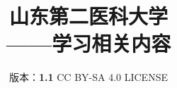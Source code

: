 

\title{%
    \normalsize
    \vspace{120pt}
    {\Huge\textbf{山东第二医科大学\\[5pt]——学习相关内容}}
}
\author{%
    版本：\textbf{1.1} \qquad%
    CC BY-SA 4.0 LICENSE \qquad%
    }
\date{\CurrentCustomTime}
\maketitle

\renewcommand{\thefootnote}{\arabic{footnote}}

\vspace{15ex}
